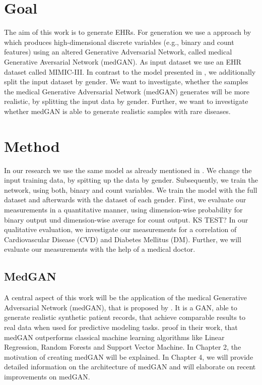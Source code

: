 \documentclass[11pt, a4paper]{book}
\begin{document}
\section{Goal}
The aim of this work is to generate EHRs. For generation we use a approach by \cite{Choi2017} which produces high-dimensional discrete variables (e.g., binary and count features) using an altered Generative Adversarial Network, called medical Generative Aversarial Network (medGAN). As input dataset we use an EHR dataset called MIMIC-III. In contrast to the model presented in \citep{Choi2017}, we additionally split the input dataset by gender.
 We want to investigate, whether the samples the medical Generative Adversarial Network (medGAN) generates will be more realistic, by splitting the input data by gender. Further, we want to investigate whether medGAN is able to generate realistic samples with rare diseases.
 
\section{Method}
In our research we use the same model as already mentioned in \cite{Choi2017}. We change the input training data, by spitting up the data by gender. Subsequently, we train the network, using both, binary and count variables. We train the model with the full dataset and afterwards with the dataset of each gender. First, we evaluate our measurements in a quantitative manner, using dimension-wise probability for binary output und dimension-wise average for count output. KS TEST? In our qualitative evaluation, we investigate our measurements for a correlation of Cardiovascular Disease (CVD) and Diabetes Mellitus (DM). Further, we will evaluate our measurements with the help of a medical doctor.

\subsection{MedGAN}
A central aspect of this work will be the application of the medical Generative Adversarial Network (medGAN), that is proposed by \cite{Choi2017}.
It is a GAN, able to generate realistic synthetic patient records, that achieve comparable results to real data when used for predictive modeling tasks. \cite{Choi2017} proof in their work, that medGAN outperforms classical machine learning algorithms like Linear Regression, Random Forests and Support Vector Machine. 
In Chapter 2, the motivation of creating medGAN will be explained. In Chapter 4, we will provide detailed information on the architecture of medGAN and will elaborate on recent improvements on medGAN.
\end{document}
